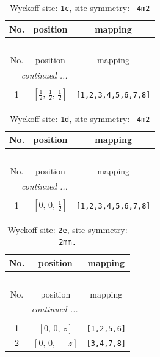 \documentclass[fleqn,8pt]{jsarticle}
\begin{document}
\begin{longtable}{ccc}
\caption{Wyckoff site: {\tt 1c}, site symmetry: {\tt -4m2}}
 \\
 \hline \hline
No. & position & mapping \\ \hline \endfirsthead

\multicolumn{2}{l}{\tablename\ \thetable{}} \\
 \hline \hline
No. & position & mapping \\ \hline \endhead

 \hline \hline
\multicolumn{2}{r}{\footnotesize\it continued ...} \\ \endfoot

 \hline \hline
\multicolumn{2}{r}{} \\ \endlastfoot

1 & $\left[ \frac{1}{2},\, \frac{1}{2},\, \frac{1}{2} \right]$ & {\tt [1,2,3,4,5,6,7,8]} \\
\end{longtable}
\renewcommand{\arraystretch}{1.2}
\begin{longtable}{ccc}
\caption{Wyckoff site: {\tt 1d}, site symmetry: {\tt -4m2}}
 \\
 \hline \hline
No. & position & mapping \\ \hline \endfirsthead

\multicolumn{2}{l}{\tablename\ \thetable{}} \\
 \hline \hline
No. & position & mapping \\ \hline \endhead

 \hline \hline
\multicolumn{2}{r}{\footnotesize\it continued ...} \\ \endfoot

 \hline \hline
\multicolumn{2}{r}{} \\ \endlastfoot

1 & $\left[ 0,\, 0,\, \frac{1}{2} \right]$ & {\tt [1,2,3,4,5,6,7,8]} \\
\end{longtable}
\renewcommand{\arraystretch}{1.2}
\begin{longtable}{ccc}
\caption{Wyckoff site: {\tt 2e}, site symmetry: {\tt 2mm.}}
 \\
 \hline \hline
No. & position & mapping \\ \hline \endfirsthead

\multicolumn{2}{l}{\tablename\ \thetable{}} \\
 \hline \hline
No. & position & mapping \\ \hline \endhead

 \hline \hline
\multicolumn{2}{r}{\footnotesize\it continued ...} \\ \endfoot

 \hline \hline
\multicolumn{2}{r}{} \\ \endlastfoot

1 & $\left[ 0,\, 0,\, z \right]$ & {\tt [1,2,5,6]} \\ \hline
2 & $\left[ 0,\, 0,\, - z \right]$ & {\tt [3,4,7,8]} \\
\end{longtable}
\end{document}
